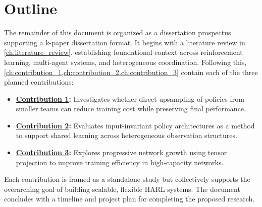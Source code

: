 \section{Outline}%

\begin{comment} %
The remainder of this document is designed to systematically explore 
the complex field of multi-agent reinforcement learning, 
particularly focusing on heterogeneous-agent systems.
Following this introductory chapter, 
\ref{ch:literature_review}: Literature Review provides a comprehensive analysis 
of the seminal and recent literature pertinent to our research focus. 
\Cref{ch:methodology} details the experimental and analytical techniques 
employed. \Cref{ch:results} presents the data and findings from our research, 
followed by \cref{ch:discussion}, where these results are interpreted 
in the context of existing knowledge and their implications for future 
research are explored.
The \emph{dissertation} will conclude with~\cref{ch:conclusion}, 
which summarizes the research and suggests avenues for further investigation. 
Each chapter builds upon the previous to provide a comprehensive understanding 
of the topic, aiming to contribute valuable insights to the field of \gls{harl}.
\end{comment}

The remainder of this document is organized as a dissertation prospectus 
supporting a k-paper dissertation format. It begins with a literature review in 
\cref{ch:literature_review}, establishing foundational context across reinforcement 
learning, multi-agent systems, and heterogeneous coordination. 
Following this, \cref{ch:contribution_1,ch:contribution_2,ch:contribution_3} 
contain each of the three planned contributions:
\begin{itemize}
    \item \textbf{\hyperref[ch:contribution_1]{Contribution 1}:} Investigates whether direct 
        upsampling of policies from smaller teams can reduce training cost while preserving 
        final performance.
    \item \textbf{\hyperref[ch:contribution_2]{Contribution 2}:} Evaluates input-invariant 
        policy architectures as a method to support shared learning across heterogeneous 
        observation structures.
    \item \textbf{\hyperref[ch:contribution_3]{Contribution 3}:} Explores progressive network 
        growth using tensor projection to improve training efficiency in high-capacity networks.
\end{itemize}
Each contribution is framed as a standalone study but collectively supports 
the overarching goal of building scalable, flexible HARL systems. 
The document concludes with a timeline and project plan for completing the proposed research.